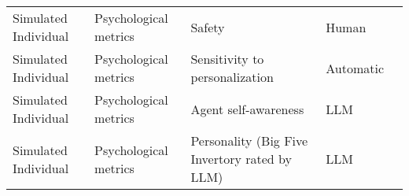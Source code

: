 \begin{small}
\begin{center}
\begin{longtable}{@{}p{}p{}p{}p{}p{}@{}}
Simulated Individual     & Psychological metrics & Safety                                                                                                                                                                                                      & Human     & \cite{Zhang2024SpeechAgentsHS}                                                                                                                                                                                                                                                                                                                                                                                                   \\
Simulated Individual     & Psychological metrics & Sensitivity to personalization                                                                                                                                                                              & Automatic & \cite{giorgi2024humanllmbiaseshate}                                                                                                                                                                                                                                                                                                                                                                                                    \\
Simulated Individual     & Psychological metrics & Agent self-awareness                                                                                                                                                                                        & LLM       & \cite{xie2024humansimulacrabenchmarkingpersonification}                                                                                                                                                                                                                                                                                                                                                                                                  \\
Simulated Individual     & Psychological metrics & Personality (Big Five Invertory rated by LLM)                                                                                                                                                               & LLM       & \cite{NEURIPS2023_21f7b745}                                                                                                                                                                                                                                                                                                                    \\

\end{longtable}
\end{center}
\end{small}

